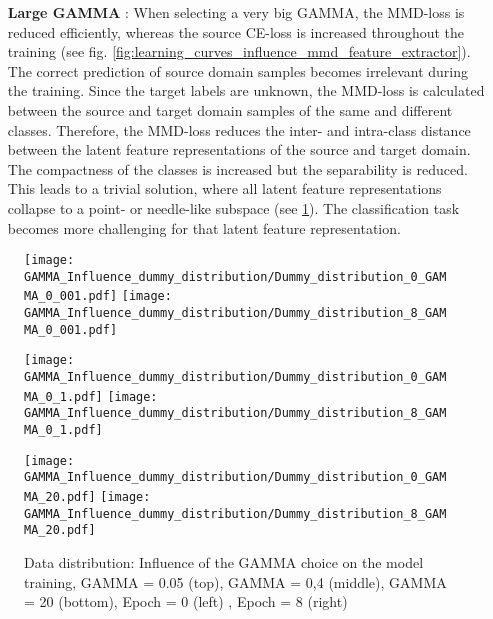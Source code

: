 \begin{itemize}
    \item [\textbf{Large GAMMA}]:
    When selecting a very big GAMMA, the MMD-loss is reduced efficiently, whereas the source CE-loss is increased throughout the training (see fig. \ref{fig:learning_curves_influence_mmd_feature_extractor}). The correct prediction of source domain samples becomes irrelevant during the training. Since the target labels are unknown, the MMD-loss is calculated between the source and target domain samples of the same and different classes. Therefore, the MMD-loss reduces the inter- and intra-class distance between the latent feature representations of the source and target domain. The compactness of the classes is increased but the separability is reduced. This leads to a trivial solution, where all latent feature representations collapse to a point- or needle-like subspace (see \ref{fig:point_cloud_mmd}). The classification task becomes more challenging for that latent feature representation.
\end{itemize}

\begin{figure}[H]
  \centering
  \texttt{[image: GAMMA\_Influence\_dummy\_distribution/Dummy\_distribution\_0\_GAMMA\_0\_001.pdf]}
  \hspace{.4cm}
  \texttt{[image: GAMMA\_Influence\_dummy\_distribution/Dummy\_distribution\_8\_GAMMA\_0\_001.pdf]}

  \vspace{.1cm}

  \texttt{[image: GAMMA\_Influence\_dummy\_distribution/Dummy\_distribution\_0\_GAMMA\_0\_1.pdf]}
  \hspace{.4cm}
  \texttt{[image: GAMMA\_Influence\_dummy\_distribution/Dummy\_distribution\_8\_GAMMA\_0\_1.pdf]}

  \vspace{.1cm}

  \texttt{[image: GAMMA\_Influence\_dummy\_distribution/Dummy\_distribution\_0\_GAMMA\_20.pdf]}
  \hspace{.4cm}
  \texttt{[image: GAMMA\_Influence\_dummy\_distribution/Dummy\_distribution\_8\_GAMMA\_20.pdf]}
 

  \caption{Data distribution: Influence of the GAMMA choice on the model training, GAMMA = 0.05 (top), GAMMA = 0,4 (middle), GAMMA = 20 (bottom), Epoch = 0 (left) , Epoch = 8 (right)}
  \label{fig:point_cloud_mmd}
\end{figure}


